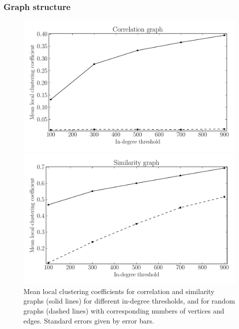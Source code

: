 \documentclass{kais}
\begin{document}
\subsubsection{Graph structure}
\label{subsubsec: graph-properties}

\begin{figure}
\centerline{\includegraphics[width=0.75\columnwidth]{figures/1460368011-c-lcc.pdf}}
\centerline{\includegraphics[width=0.75\columnwidth]{figures/1460368011-s-lcc.pdf}}
\caption{Mean local clustering coefficients for correlation and similarity graphs (solid lines) for different in-degree thresholds,
and for random graphs (dashed lines) with corresponding numbers of vertices and edges. Standard errors given by error bars.}
\label{fig:clust-coeffs}
\end{figure}
\end{document}
